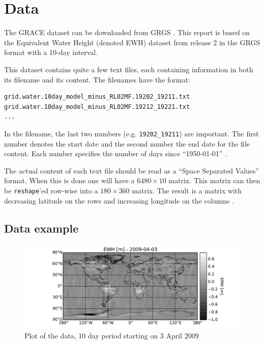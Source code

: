 \section{Data}

The GRACE dataset can be downloaded from GRGS \cite{GRACE-data-source}.
This report is based on the Equivalent Water Height (denoted EWH) dataset from release 2 in the GRGS format with a 10-day interval.

This dataset contains quite a few text files, each containing information in both its filename and its content.
The filenames have the format:

\begin{lstlisting}
grid.water.10day_model_minus_RL02MF.19202_19211.txt
grid.water.10day_model_minus_RL02MF.19212_19221.txt
...
\end{lstlisting}

In the filename, the last two numbers (e.g. \texttt{19202\_19211}) are important.
The first number denotes the start date and the second number the end date for the file content.
Each number specifies the number of days since ``1950-01-01'' \cite{GRACE-data-format-dates}.

The actual content of each text file should be read as a ``Space Separated Values'' format.
When this is done one will have a $6480 \times 10$ matrix.
This matrix can then be \texttt{reshape}'ed row-wise into a $180 \times 360$ matrix.
The result is a matrix with decreasing latitude on the rows and increasing longitude on the columns \cite{GRACE-data-format-grids}.

\subsection{Data example}

\begin{figure}[H]
	\centering
	\includegraphics[width=\textwidth]{figures/data-example-world}
	\caption{Plot of the data, 10 day period starting on 3 April 2009}
	\label{fig:data-example-world}
\end{figure}

